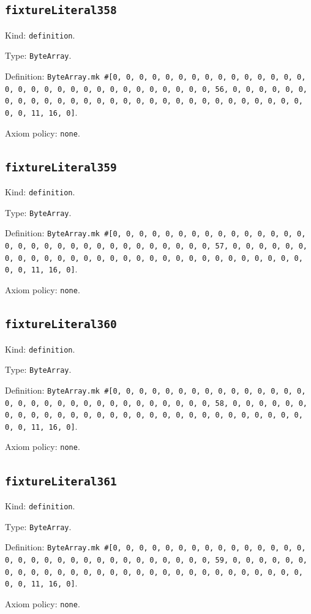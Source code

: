 \documentclass[11pt]{article}
\begin{document}
\subsection*{\texttt{fixtureLiteral358}}
\noindent Kind: \texttt{definition}.\par
\noindent Type: \texttt{ByteArray}.\par
\noindent Definition: \texttt{ByteArray.mk \#[0, 0, 0, 0, 0, 0, 0, 0, 0, 0, 0, 0, 0, 0, 0, 0, 0, 0, 0, 0, 0, 0, 0, 0, 0, 0, 0, 0, 0, 0, 0, 56, 0, 0, 0, 0, 0, 0, 0, 0, 0, 0, 0, 0, 0, 0, 0, 0, 0, 0, 0, 0, 0, 0, 0, 0, 0, 0, 0, 0, 0, 0, 0, 11, 16, 0]}.\par
\noindent Axiom policy: \texttt{none}.\par
\subsection*{\texttt{fixtureLiteral359}}
\noindent Kind: \texttt{definition}.\par
\noindent Type: \texttt{ByteArray}.\par
\noindent Definition: \texttt{ByteArray.mk \#[0, 0, 0, 0, 0, 0, 0, 0, 0, 0, 0, 0, 0, 0, 0, 0, 0, 0, 0, 0, 0, 0, 0, 0, 0, 0, 0, 0, 0, 0, 0, 57, 0, 0, 0, 0, 0, 0, 0, 0, 0, 0, 0, 0, 0, 0, 0, 0, 0, 0, 0, 0, 0, 0, 0, 0, 0, 0, 0, 0, 0, 0, 0, 11, 16, 0]}.\par
\noindent Axiom policy: \texttt{none}.\par
\subsection*{\texttt{fixtureLiteral360}}
\noindent Kind: \texttt{definition}.\par
\noindent Type: \texttt{ByteArray}.\par
\noindent Definition: \texttt{ByteArray.mk \#[0, 0, 0, 0, 0, 0, 0, 0, 0, 0, 0, 0, 0, 0, 0, 0, 0, 0, 0, 0, 0, 0, 0, 0, 0, 0, 0, 0, 0, 0, 0, 58, 0, 0, 0, 0, 0, 0, 0, 0, 0, 0, 0, 0, 0, 0, 0, 0, 0, 0, 0, 0, 0, 0, 0, 0, 0, 0, 0, 0, 0, 0, 0, 11, 16, 0]}.\par
\noindent Axiom policy: \texttt{none}.\par
\subsection*{\texttt{fixtureLiteral361}}
\noindent Kind: \texttt{definition}.\par
\noindent Type: \texttt{ByteArray}.\par
\noindent Definition: \texttt{ByteArray.mk \#[0, 0, 0, 0, 0, 0, 0, 0, 0, 0, 0, 0, 0, 0, 0, 0, 0, 0, 0, 0, 0, 0, 0, 0, 0, 0, 0, 0, 0, 0, 0, 59, 0, 0, 0, 0, 0, 0, 0, 0, 0, 0, 0, 0, 0, 0, 0, 0, 0, 0, 0, 0, 0, 0, 0, 0, 0, 0, 0, 0, 0, 0, 0, 11, 16, 0]}.\par
\noindent Axiom policy: \texttt{none}.\par
\end{document}
